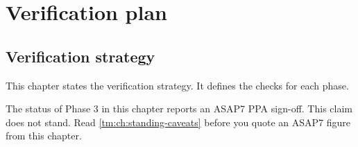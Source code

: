 \part{Verification plan}\label{ds:part:verification-plan}

\chapter{Verification strategy}\label{ds:ch:verification-strategy}

This chapter states the verification strategy. It defines the checks for each phase.

\begin{information}
The status of Phase 3 in this chapter reports an ASAP7 PPA sign-off. This claim does not stand. Read \cref{tm:ch:standing-caveats} before you quote an ASAP7 figure from this chapter.
\end{information}

